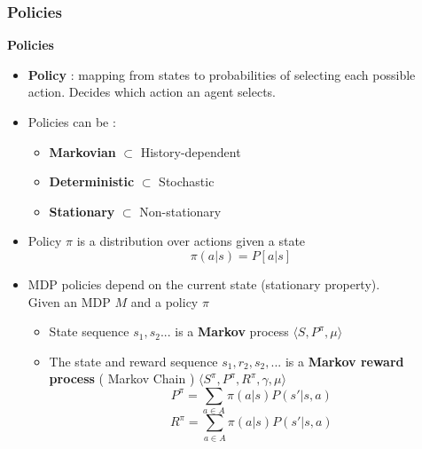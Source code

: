 \documentclass[12pt]{article} %
\begin{document}
\subsubsection{Policies}
\textbf{Policies}
\begin{itemize}
\item \textbf{Policy} : mapping from states to probabilities of selecting each possible action. Decides which action an agent selects.

\item Policies can be :
\begin{itemize}
\item \textbf{Markovian} $\subset$ History-dependent
\item \textbf{Deterministic} $\subset$ Stochastic
\item \textbf{Stationary} $\subset$ Non-stationary
\end{itemize}

\item Policy $\pi$ is a distribution over actions given a state
$$ \pi(a|s) = P[a|s]$$
\item MDP policies depend on the current state (stationary property).\\
Given an MDP $M$ and a policy $\pi$
\begin{itemize}
\item State sequence $s_1,s_2...$ is a \textbf{Markov} process $\langle S, P^{\pi},\mu \rangle$
\item The state and reward sequence $s_1,r_2,s_2,...$ is a \textbf{Markov	reward process} ( Markov Chain ) $\langle S^{\pi} ,P^{\pi} , R^{\pi}, \gamma ,\mu \rangle$
$$ P^{\pi} = \sum_{a \in A} \pi(a|s)P(s'|s,a)$$
$$ R^{\pi} = \sum_{a \in A } \pi(a|s)P(s'|s,a)$$
\end{itemize}
\end{itemize}
\end{document}
